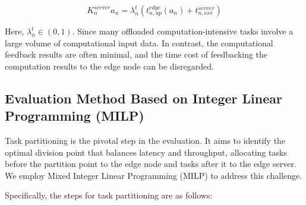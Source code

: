 \documentclass[preprint,12pt,authoryear]{elsarticle}
\begin{document}
\begin{equation}
    K_n^{server} {a_n}=\lambda_n^t (t_{n,up}^{edge} (a_n )+t_{n,exe}^{server} )
\end{equation}

Here, \(\lambda_n^t\in(0,1)\). Since many offloaded computation-intensive tasks involve a large volume of computational input data. In contrast, the computational feedback results are often minimal, and the time cost of feedbacking the computation results to the edge node can be disregarded.

\subsection{Evaluation Method Based on Integer Linear Programming (MILP)}

Task partitioning is the pivotal step in the evaluation. It aims to identify the optimal division point that balances latency and throughput, allocating tasks before the partition point to the edge node and tasks after it to the edge server. We employ Mixed Integer Linear Programming (MILP) to address this challenge.

Specifically, the steps for task partitioning are as follows:
\end{document}
